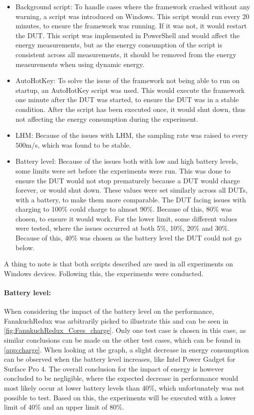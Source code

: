 \begin{itemize}
    \item Background script: To handle cases where the framework crashed without any warning, a script was introduced on Windows. This script would run every 20 minutes, to ensure the framework was running. If it was not, it would restart the DUT. This script was implemented in PowerShell and would affect the energy measurements, but as the energy consumption of the script is consistent across all measurements, it should be removed from the energy measurements when using dynamic energy.
    \item AutoHotKey: To solve the issue of the framework not being able to run on startup, an AutoHotKey script was used. This would execute the framework one minute after the DUT was started, to ensure the DUT was in a stable condition. After the script has been executed once, it would shut down, thus not affecting the energy consumption during the experiment.
    \item LHM: Because of the issues with LHM, the sampling rate was raised to every $500$m/s, which was found to be stable.
    \item Battery level: Because of the issues both with low and high battery levels, some limits were set before the experiments were run. This was done to ensure the DUT would not stop prematurely because a DUT would charge forever, or would shut down. These values were set similarly across all DUTs, with a battery, to make them more comparable. The DUT facing issues with charging to 100\% could charge to almost 90\%. Because of this, 80\% was chosen, to ensure it would work. For the lower limit, some different values were tested, where the issues occurred at both 5\%, 10\%, 20\% and 30\%. Because of this, 40\% was chosen as the battery level the DUT could not go below.
\end{itemize}

A thing to note is that both scripts described are used in all experiments on Windows devices. Following this, the experiments were conducted.



\paragraph{Battery level:} When considering the impact of the battery level on the performance, FannkuchRedux was arbitrarily picked to illustrate this and can be seen in \cref{fig:FannkuchRedux_Cores_charge}. Only one test case is chosen in this case, as similar conclusions can be made on the other test cases, which can be found in \cref{app:charge}. When looking at the graph, a slight decrease in energy consumption can be observed when the battery level increases, like Intel Power Gadget for Surface Pro 4. The overall conclusion for the impact of energy is however concluded to be negligible, where the expected decrease in performance would most likely occur at lower battery levels than 40\%, which unfortunately was not possible to test. Based on this, the experiments will be executed with a lower limit of 40\% and an upper limit of 80\%.

